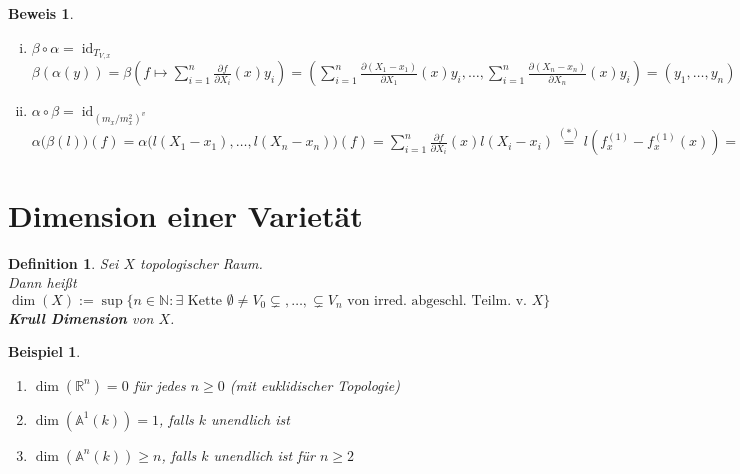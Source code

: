 \documentclass[a4paper,12pt]{report}
\theoremstyle{break}
\newtheorem{Def}{Definition}[section]
\theoremstyle{nonumberbreak}
\newtheorem{nnBsp}{Beispiel}
\newtheorem{Bew}{Beweis}
\theoremstyle{nonumberplain}
\newcommand{\emp}[1]{\textbf{\emph{#1}}}
\newcommand{\begriff}[1]{{\index{#1}}\emp{#1}}
\newcommand{\Sum}{\sum\limits}
\DeclareMathOperator{\id}{id}
\newcommand{\R}{\mathbb{R}}
\newcommand{\N}{\mathbb{N}}
\newcommand{\A}{\mathbb{A}}
\begin{document}
\begin{Bew}
\begin{enumerate}[i)]
	\emph{Zu zeigen:} $\left(l(\overline{X_1-x_1}),\ldots ,l(\overline{X_n-x_n})\right) \in T_{V,x}$\\
	Sei dazu $f\in I(V)$. \emph{Zu zeigen:} $f_x^{(1)}\left(l(\overline{X_1-x_1}),\ldots ,l(\overline{X_n-x_n})\right)=0$\\
	Es ist $f_x^{(1)}\left(l(\overline{X_1-x_1}),\ldots ,l(\overline{X_n-x_n})\right)= \Sum_{i=1}^n \frac{\partial f}{\partial X_i}(x)l(\overline{X_i-x_i})$ $= l\left(\Sum_{i=1}^n \frac{\partial f}{\partial X_i}(x)(X_i-x_i)\right)$ $\overset{(*)}{=}$ $l\left( f_x^{(1)}-f_x^{(1)}(x) \right) = 0$, wegen\\
	\emph{Behauptung:} $f_x^{(1)}-f_x^{(1)}(x)\in m_x^2$\\
	\emph{denn:} Taylor-Entwicklung $\underbrace{f}_{0\text{ in }k[V]}= \underbrace{f(x)}_{=0\text{, weil }f\in I(V)}+f_x^{(1)}-f_x^{(1)}(x)+ $Terme in $m_x^2$
\item
	$\beta\circ\alpha=\id_{T_{V,x}}$\\
	$\beta(\alpha(y))= \beta(f\mapsto\Sum_{i=1}^n\frac{\partial f}{\partial X_i}(x)y_i) = \left(\Sum_{i=1}^n\frac{\partial(X_1-x_1)}{\partial X_1}(x)y_i,\ldots ,\Sum_{i=1}^n\frac{\partial(X_n-x_n)}{\partial X_n}(x)y_i\right) = (y_1,\ldots ,y_n)$
\item
	$\alpha\circ\beta=\id_{(m_x/m_x^2)^v}$\\
	$\alpha\bigl(\beta(l)\bigr)(f)= \alpha\bigl(l(X_1-x_1),\ldots ,l(X_n-x_n)\bigr)(f) = \Sum_{i=1}^n\frac{\partial f}{\partial X_i}(x)l(X_i-x_i) \overset{(*)}{=} l\left(f_x^{(1)}-f_x^{(1)}(x)\right) = f(\overline f)$
\end{enumerate}\end{Bew}

\newpage


\section{Dimension einer Variet\"at}

\begin{Def}
Sei $X$ topologischer Raum.\\
Dann hei\ss t
	\[\dim(X):=\sup\{n\in\N:\exists\text{ Kette }\emptyset\ne V_0\subsetneq,\ldots ,\subsetneq V_n\text{ von irred. abgeschl. Teilm. v. }X\}\]
	\begriff{Krull Dimension} von $X$.
\end{Def}

\begin{nnBsp}\begin{enumerate}[1)]
\item
	$\dim(\R^n)=0$ f\"ur jedes $n\ge0$ (mit euklidischer Topologie)
\item
	$\dim(\A^1(k))=1$, falls $k$ unendlich ist
\item
	$\dim(\A^n(k))\ge n$, falls $k$ unendlich ist f\"ur $n\ge2$
\end{enumerate}\end{nnBsp}
\end{document}

